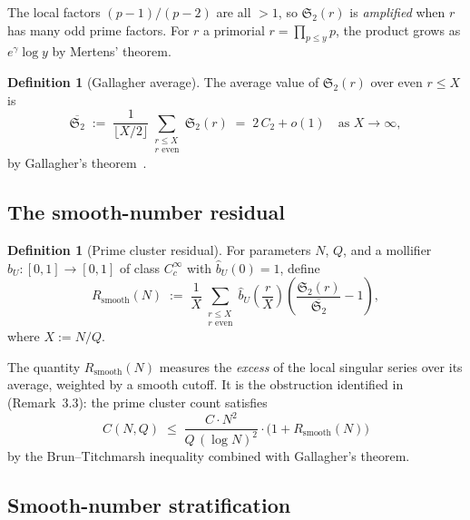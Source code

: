 \documentclass[11pt,reqno]{amsart}
\theoremstyle{plain}
\theoremstyle{definition}
\newtheorem{definition}[theorem]{Definition}
\theoremstyle{remark}
\newcommand{\Rsmooth}{R_{\mathrm{smooth}}}
\newcommand{\Sfrak}{\mathfrak{S}_2}
\begin{document}
The local factors $(p-1)/(p-2)$ are all $> 1$, so $\Sfrak(r)$ is
\emph{amplified} when $r$ has many odd prime factors. For $r$ a primorial
$r = \prod_{p \le y} p$, the product grows as $e^{\gamma} \log y$
by Mertens' theorem.

\begin{definition}[Gallagher average]\label{def:Sbar}
The average value of $\Sfrak(r)$ over even $r \le X$ is
\[
  \overline{\Sfrak} \;:=\; \frac{1}{\lfloor X/2 \rfloor}
  \sum_{\substack{r \le X \\ r \text{ even}}} \Sfrak(r)
  \;=\; 2\, C_2 + o(1)
  \quad\text{as } X \to \infty,
\]
by Gallagher's theorem~\cite{Gallagher1976}.
\end{definition}

\subsection{The smooth-number residual}

\begin{definition}[Prime cluster residual]\label{def:Rsmooth}
For parameters $N$, $Q$, and a mollifier $\hat{b}_U \colon [0,1] \to [0,1]$
of class $C_c^{\infty}$ with $\hat{b}_U(0) = 1$, define
\begin{equation}\label{eq:Rsmooth}
  \Rsmooth(N) \;:=\;
  \frac{1}{X} \sum_{\substack{r \le X \\ r \text{ even}}}
  \hat{b}_U\!\left(\frac{r}{X}\right)
  \left(\frac{\Sfrak(r)}{\overline{\Sfrak}} - 1\right),
\end{equation}
where $X := N/Q$.
\end{definition}

The quantity $\Rsmooth(N)$ measures the \emph{excess} of the
local singular series over its average, weighted by a smooth cutoff.
It is the obstruction identified in~\cite{G37} (Remark~3.3): the prime
cluster count satisfies
\[
  C(N,Q) \;\le\; \frac{C \cdot N^2}{Q\,(\log N)^2}
  \cdot \bigl(1 + \Rsmooth(N)\bigr)
\]
by the Brun--Titchmarsh inequality combined with Gallagher's theorem.

\subsection{Smooth-number stratification}
\end{document}
